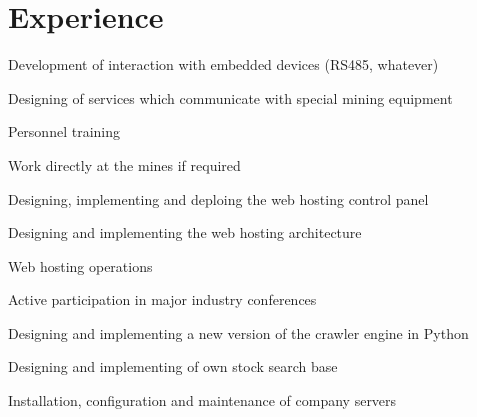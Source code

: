 \documentclass[]{schorscv}
\begin{document}
\begin{minipage}[t]{0.70\textwidth} 



\section{Experience}
\vspace{\topsep} %
\begin{tightemize}
\sectionsep
\item Development of interaction with embedded devices (RS485, whatever)
\item Designing of services which communicate with special mining equipment
\item Personnel training
\item Work directly at the mines if required
\end{tightemize}
\sectionsep

\begin{tightemize}
\sectionsep
\item Designing, implementing and deploing the web hosting control panel
\item Designing and implementing the web hosting architecture
\item Web hosting operations
\item Active participation in major industry conferences
\end{tightemize}
\sectionsep

\begin{tightemize}
\sectionsep
\item Designing and implementing a new version of the crawler engine in Python
\item Designing and implementing of own stock search base
\item Installation, configuration and maintenance of company servers
\end{tightemize}
\sectionsep



\end{minipage}
\end{document}
